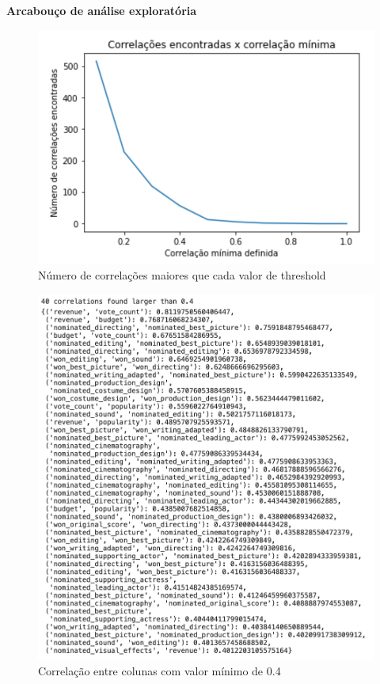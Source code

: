             \textbf{Arcabouço de análise exploratória}\par

            \begin{figure}[htb]
            	\caption{\label{corrs_graph}Número de correlações maiores que cada valor de threshold}
            	\begin{center}
            		\includegraphics[scale=0.8]{corrs_graph.png}
            	\end{center}
            \end{figure}

            \begin{figure}[htb]
            	\caption{\label{corrs0.4}Correlação entre colunas com valor mínimo de 0.4}
            	\begin{center}
            		\includegraphics[scale=0.7]{corrs0.4.png}
            	\end{center}
            \end{figure}

